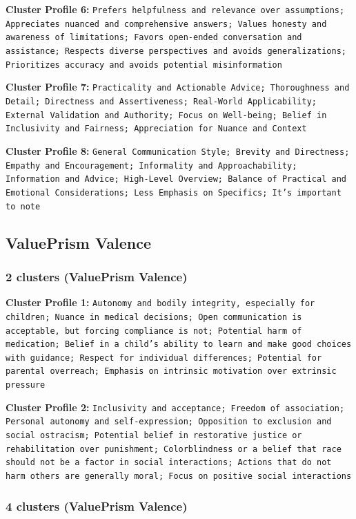 \documentclass[11pt]{article}
\begin{document}
\textbf{Cluster Profile 6:} \texttt{Prefers helpfulness and relevance over assumptions; Appreciates nuanced and comprehensive answers; Values honesty and awareness of limitations; Favors open-ended conversation and assistance; Respects diverse perspectives and avoids generalizations; Prioritizes accuracy and avoids potential misinformation}

\textbf{Cluster Profile 7:} \texttt{Practicality and Actionable Advice; Thoroughness and Detail; Directness and Assertiveness; Real-World Applicability; External Validation and Authority; Focus on Well-being; Belief in Inclusivity and Fairness; Appreciation for Nuance and Context}

\textbf{Cluster Profile 8:} \texttt{General Communication Style; Brevity and Directness; Empathy and Encouragement; Informality and Approachability; Information and Advice; High-Level Overview; Balance of Practical and Emotional Considerations; Less Emphasis on Specifics; It's important to note}


\subsection{ValuePrism Valence}

\subsubsection{2 clusters (ValuePrism Valence)}

\textbf{Cluster Profile 1:} \texttt{Autonomy and bodily integrity, especially for children; Nuance in medical decisions; Open communication is acceptable, but forcing compliance is not; Potential harm of medication; Belief in a child's ability to learn and make good choices with guidance; Respect for individual differences; Potential for parental overreach; Emphasis on intrinsic motivation over extrinsic pressure}

\textbf{Cluster Profile 2:} \texttt{Inclusivity and acceptance; Freedom of association; Personal autonomy and self-expression; Opposition to exclusion and social ostracism; Potential belief in restorative justice or rehabilitation over punishment; Colorblindness or a belief that race should not be a factor in social interactions; Actions that do not harm others are generally moral; Focus on positive social interactions}

\subsubsection{4 clusters (ValuePrism Valence)}
\end{document}
